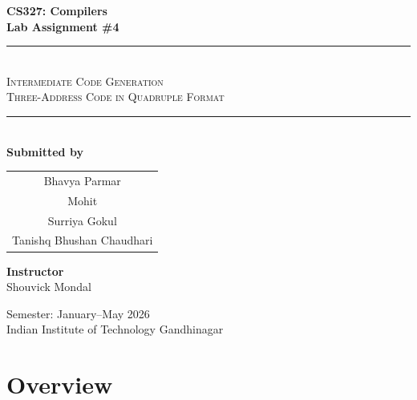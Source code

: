 \documentclass[11pt]{article}
\begin{document}
\begin{titlepage}
    \centering

    \vspace*{1.5cm}

    {\Huge \textbf{CS327: Compilers}}\\[0.4cm]
    {\LARGE \textbf{Lab Assignment \#4}}\\[1.2cm]

    \rule{0.7\textwidth}{0.5pt}\\[0.6cm]
    {\Large \textsc{Intermediate Code Generation}}\\[0.4cm]
    {\large \textsc{Three-Address Code in Quadruple Format}}\\[0.6cm]
    \rule{0.7\textwidth}{0.5pt}\\[1.8cm]

    {\large \textbf{Submitted by}}\\[0.5cm]
    \begin{tabular}{c}
        Bhavya Parmar \\[0.2cm]
        Mohit \\[0.2cm]
        Surriya Gokul \\[0.2cm]
        Tanishq Bhushan Chaudhari
    \end{tabular}

    \vspace{1.5cm}

    {\large \textbf{Instructor}}\\[0.3cm]
    Shouvick Mondal

    \vfill

    {\large
    Semester: January--May 2026\\[0.2cm]
    Indian Institute of Technology Gandhinagar
    }
\end{titlepage}

\tableofcontents
\newpage
{}

\section{Overview}
\end{document}

